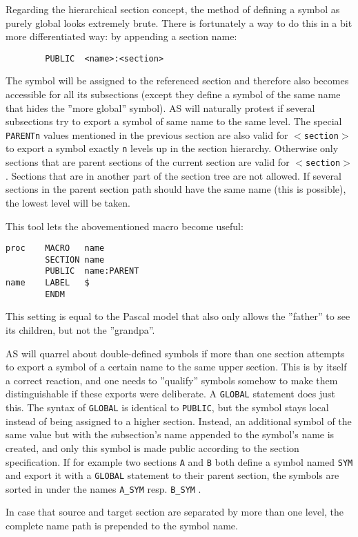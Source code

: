 \documentclass[12pt,twoside]{report}
\newcommand{\tty}[1]{{\tt #1}}
\newcommand{\asname}{{AS}}
\begin{document}
Regarding the hierarchical section concept, the method of defining a
symbol as purely global looks extremely brute.  There is fortunately
a way to do this in a bit more differentiated way: by appending a
section name:
\begin{verbatim}
        PUBLIC  <name>:<section>
\end{verbatim}
The symbol will be assigned to the referenced section and therefore also
becomes accessible for all its subsections (except they define a symbol of
the same name that hides the ''more global'' symbol).  \asname{} will naturally
protest if several subsections try to export a symbol of same name to the
same level.  The special \tty{PARENTn} values mentioned in the previous
section are also valid for \tty{$<$section$>$} to export a symbol exactly
\tty{n} levels up in the section hierarchy.  Otherwise only sections that
are parent sections of the current section are valid for
\tty{$<$section$>$}.  Sections that are in another part of the section
tree are not allowed.  If several sections in the parent section path
should have the same name (this is possible), the lowest level will be
taken.

This tool lets the abovementioned macro become useful:
\begin{verbatim}
proc    MACRO   name
        SECTION name
        PUBLIC  name:PARENT
name    LABEL   $
        ENDM
\end{verbatim}
This setting is equal to the Pascal model that also only allows the
''father'' to see its children, but not the ''grandpa''.

\asname{} will quarrel about double-defined symbols if more than one section
attempts to export a symbol of a certain name to the same upper section.
This is by itself a correct reaction, and one needs to ''qualify'' symbols
somehow to make them distinguishable if these exports were deliberate.  A
\tty{GLOBAL} statement does just this.  The syntax of \tty{GLOBAL} is
identical to \tty{PUBLIC}, but the symbol stays local instead of being
assigned to a higher section.  Instead, an additional symbol of the same
value but with the subsection's name appended to the symbol's name is
created, and only this symbol is made public according to the section
specification.  If for example two sections \tty{A} and \tty{B} both
define a symbol named \tty{SYM} and export it with a \tty{GLOBAL}
statement to their parent section, the symbols are sorted in under the
names \tty{A\_SYM} resp. \tty{B\_SYM} .

In case that source and target section are separated by more than one
level, the complete name path is prepended to the symbol name.
\end{document}
